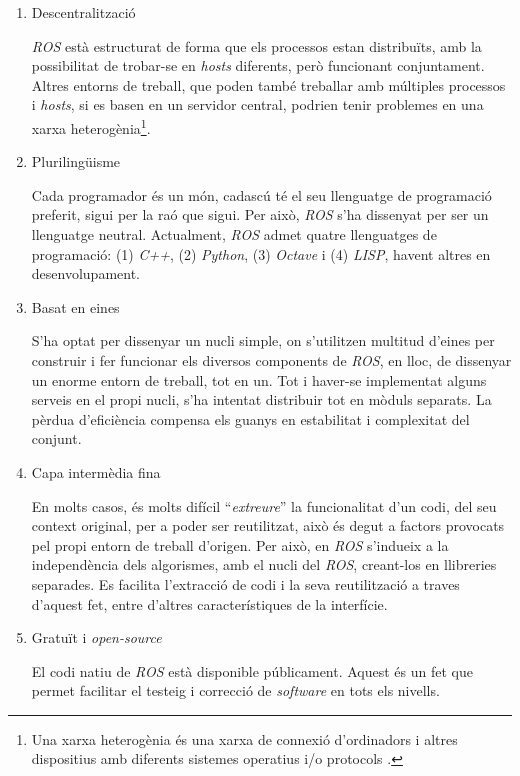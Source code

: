 \documentclass[12pt,a4paper,final,twoside]{report}
\begin{document}
\begin{enumerate}

\item Descentralització

\textit{ROS} està estructurat de forma que els processos estan distribuïts, amb la possibilitat de trobar-se en \textit{hosts} diferents, però funcionant conjuntament. Altres entorns de treball, que poden també treballar amb múltiples processos i \textit{hosts}, si es basen en un servidor central, podrien tenir problemes en una xarxa heterogènia\footnote{Una xarxa heterogènia és una xarxa de connexió d'ordinadors i altres dispositius amb diferents sistemes operatius i/o protocols \cite{Delphinanto2011}.}.

\item Plurilingüisme

Cada programador és un món, cadascú té el seu llenguatge de programació preferit, sigui per la raó que sigui. Per això, \textit{ROS} s'ha dissenyat per ser un llenguatge neutral. Actualment, \textit{ROS} admet quatre llenguatges de programació: (1) \textit{C++}, (2) \textit{Python}, (3) \textit{Octave} i (4) \textit{LISP}, havent altres en desenvolupament.

\item Basat en eines

S'ha optat per dissenyar un nucli simple, on s'utilitzen multitud d'eines per construir i fer funcionar els diversos components de \textit{ROS}, en lloc, de dissenyar un enorme entorn de treball, tot en un. Tot i haver-se implementat alguns serveis en el propi nucli, s'ha intentat distribuir tot en mòduls separats. La pèrdua d'eficiència compensa els guanys en estabilitat i complexitat del conjunt.

\item Capa intermèdia fina

En molts casos, és molts difícil ``\textit{extreure}'' la funcionalitat d'un codi, del seu context original, per a poder ser reutilitzat, això és degut a factors provocats pel propi entorn de treball d'origen. Per això, en \textit{ROS} s'indueix a la independència dels algorismes, amb el nucli del \textit{ROS}, creant-los en llibreries separades. Es facilita l'extracció de codi i la seva reutilització a traves d'aquest fet, entre d'altres característiques de la interfície.

\item Gratuït i \textit{open-source}

El codi natiu de \textit{ROS} està disponible públicament. Aquest és un fet que permet facilitar el testeig i correcció de \textit{software} en tots els nivells. 

\end{enumerate}
\end{document}
